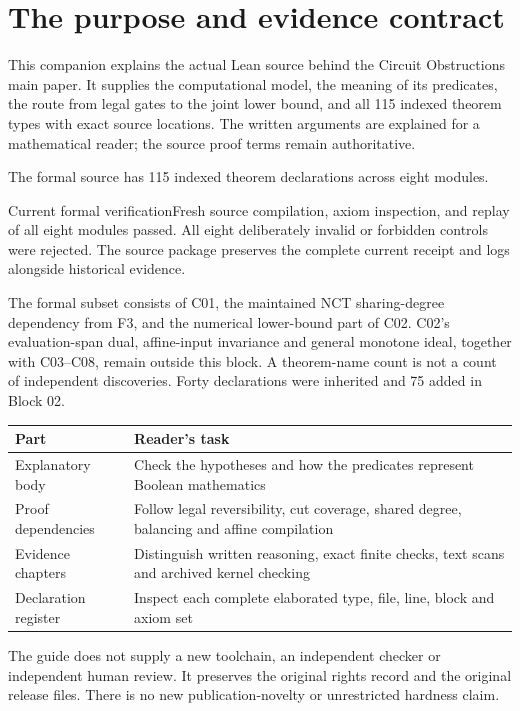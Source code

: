 \section*{The purpose and evidence contract}
This companion explains the actual Lean source behind the Circuit Obstructions
main paper. It supplies the computational model, the meaning of its predicates,
the route from legal gates to the joint lower bound, and all 115 indexed
theorem types with exact source locations. The written arguments are explained
for a mathematical reader; the source proof terms remain authoritative.

The formal source has 115 indexed theorem declarations across eight modules.\begin{statusbox}{Current formal verification}Fresh source compilation, axiom inspection, and replay of all eight modules passed. All eight deliberately invalid or forbidden controls were rejected. The source package preserves the complete current receipt and logs alongside historical evidence.\end{statusbox}

The formal subset consists of C01, the maintained NCT sharing-degree dependency
from F3, and the numerical lower-bound part of C02. C02's evaluation-span dual,
affine-input invariance and general monotone ideal, together with C03--C08,
remain outside this block. A theorem-name count is not a count of independent
discoveries. Forty declarations were inherited and 75 added in Block 02.

\begin{tabularx}{\textwidth}{@{}>{\raggedright\arraybackslash}p{1.35in}>{\raggedright\arraybackslash}X@{}}\toprule
Part & Reader's task\\\midrule
Explanatory body & Check the hypotheses and how the predicates represent Boolean mathematics\\
Proof dependencies & Follow legal reversibility, cut coverage, shared degree, balancing and affine compilation\\
Evidence chapters & Distinguish written reasoning, exact finite checks, text scans and archived kernel checking\\
Declaration register & Inspect each complete elaborated type, file, line, block and axiom set\\\bottomrule
\end{tabularx}

The guide does not supply a new toolchain, an independent checker or independent
human review. It preserves the original rights record and the original release
files. There is no new publication-novelty or unrestricted hardness claim.
\clearpage
